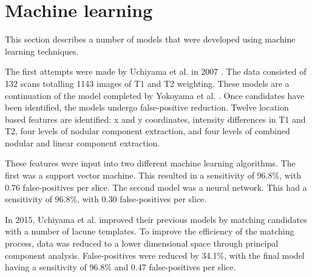 \section{Machine learning}\label{litrev-ml}

This section describes a number of models that were developed using machine learning techniques. 

The first attempts were made by Uchiyama et al. in 2007 \cite{Uchiyama20071554, Uchiyama2007b}. The data consisted of 132 scans totalling 1143 images of T1 and T2 weighting. These models are a continuation of the model completed by Yokoyama et al. \cite{Yokoyama2007}. Once candidates have been identified, the models undergo false-positive reduction. Twelve location based features are identified: x and y coordinates, intensity differences in T1 and T2, four levels of nodular component extraction, and four levels of combined nodular and linear component extraction.

These features were input into two different machine learning algorithms. The first was a support vector machine. This resulted in a sensitivity of 96.8\%, with 0.76 false-positives per slice. The second model was a neural network. This had a sensitivity of 96.8\%, with 0.30 false-positives per slice.

In 2015, Uchiyama et al. \cite{Uchiyama2015} improved their previous models by matching candidates with a number of lacune templates. To improve the efficiency of the matching process, data was reduced to a lower dimensional space through principal component analysis. False-positives were reduced by 34.1\%, with the final model having a sensitivity of 96.8\% and 0.47 false-positives per slice.





